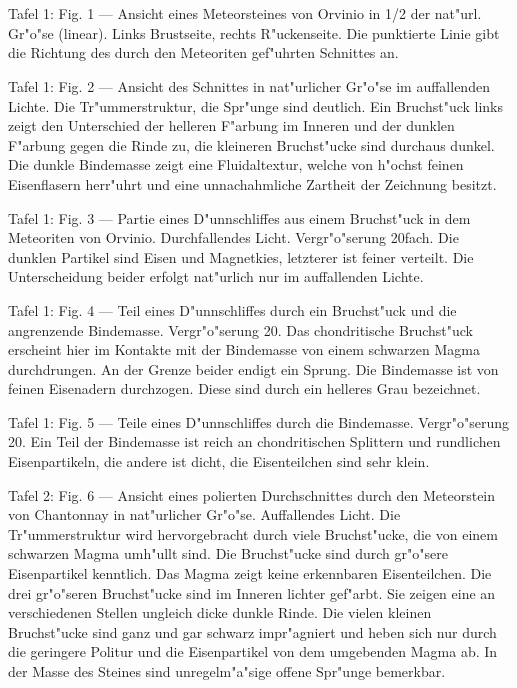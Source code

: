 \documentclass[a4paper, 11pt, oneside]{article}
\begin{document}
\section{}
\paragraph{}
Tafel 1: Fig. 1 --- Ansicht eines Meteorsteines von Orvinio in 1/2 der nat"url. Gr"o"se (linear). Links Brustseite, rechts R"uckenseite. Die punktierte Linie gibt die Richtung des durch den Meteoriten gef"uhrten Schnittes an.

Tafel 1: Fig. 2 --- Ansicht des Schnittes in nat"urlicher Gr"o"se im auffallenden Lichte. Die Tr"ummerstruktur, die Spr"unge sind deutlich. Ein Bruchst"uck links zeigt den Unterschied der helleren F"arbung im Inneren und der dunklen F"arbung gegen die Rinde zu, die kleineren Bruchst"ucke sind durchaus dunkel. Die dunkle Bindemasse zeigt eine Fluidaltextur, welche von h"ochst feinen Eisenflasern herr"uhrt und eine unnachahmliche Zartheit der Zeichnung besitzt.

Tafel 1: Fig. 3 --- Partie eines D"unnschliffes aus einem Bruchst"uck in dem Meteoriten von Orvinio. Durchfallendes Licht. Vergr"o"serung 20fach. Die dunklen Partikel sind Eisen und Magnetkies, letzterer ist feiner verteilt. Die Unterscheidung beider erfolgt nat"urlich nur im auffallenden Lichte.

Tafel 1: Fig. 4 --- Teil eines D"unnschliffes durch ein Bruchst"uck und die angrenzende Bindemasse. Vergr"o"serung 20. Das chondritische Bruchst"uck erscheint hier im Kontakte mit der Bindemasse von einem schwarzen Magma durchdrungen. An der Grenze beider endigt ein Sprung. Die Bindemasse ist von feinen Eisenadern durchzogen. Diese sind durch ein helleres Grau bezeichnet.

Tafel 1: Fig. 5 --- Teile eines D"unnschliffes durch die Bindemasse. Vergr"o"serung 20. Ein Teil der Bindemasse ist reich an chondritischen Splittern und rundlichen Eisenpartikeln, die andere ist dicht, die Eisenteilchen sind sehr klein.

Tafel 2: Fig. 6 --- Ansicht eines polierten Durchschnittes durch den Meteorstein von Chantonnay in nat"urlicher Gr"o"se. Auffallendes Licht. Die Tr"ummerstruktur wird hervorgebracht durch viele Bruchst"ucke, die von einem schwarzen Magma umh"ullt sind. Die Bruchst"ucke sind durch gr"o"sere Eisenpartikel kenntlich. Das Magma zeigt keine erkennbaren Eisenteilchen. Die drei gr"o"seren Bruchst"ucke sind im Inneren lichter gef"arbt. Sie zeigen eine an verschiedenen Stellen ungleich dicke dunkle Rinde. Die vielen kleinen Bruchst"ucke sind ganz und gar schwarz impr"agniert und heben sich nur durch die geringere Politur und die Eisenpartikel von dem umgebenden Magma ab. In der Masse des Steines sind unregelm"a"sige offene Spr"unge bemerkbar.
\end{document}
